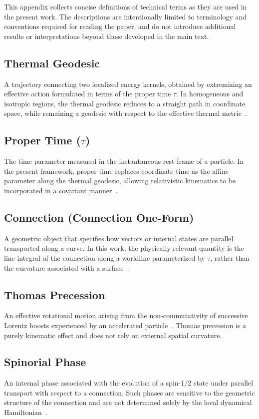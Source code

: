 \documentclass[%
 reprint,
 amsmath,amssymb,
 aps,
 prb,
]{revtex4-2}
\numberwithin{equation}{section}
\begin{document}
This appendix collects concise definitions of technical terms as they are used in the present work. The descriptions are intentionally limited to terminology and conventions required for reading the paper, and do not introduce additional results or interpretations beyond those developed in the main text.

\subsection*{Thermal Geodesic}
A trajectory connecting two localized energy kernels, obtained by extremizing an effective action formulated in terms of the proper time $\tau$. In homogeneous and isotropic regions, the thermal geodesic reduces to a straight path in coordinate space, while remaining a geodesic with respect to the effective thermal metric~\cite{hanamura17765017}.

\subsection*{Proper Time ($\tau$)}
The time parameter measured in the instantaneous rest frame of a particle. In the present framework, proper time replaces coordinate time as the affine parameter along the thermal geodesic, allowing relativistic kinematics to be incorporated in a covariant manner~\cite{schwinger1951,bjorken1964}.

\subsection*{Connection (Connection One-Form)}
A geometric object that specifies how vectors or internal states are parallel transported along a curve. In this work, the physically relevant quantity is the line integral of the connection along a worldline parameterized by $\tau$, rather than the curvature associated with a surface~\cite{nakahara2003}.

\subsection*{Thomas Precession}
An effective rotational motion arising from the non-commutativity of successive Lorentz boosts experienced by an accelerated particle~\cite{thomas1926,Jackson1999}. Thomas precession is a purely kinematic effect and does not rely on external spatial curvature.

\subsection*{Spinorial Phase}
An internal phase associated with the evolution of a spin-1/2 state under parallel transport with respect to a connection. Such phases are sensitive to the geometric structure of the connection and are not determined solely by the local dynamical Hamiltonian~\cite{wigner1939,sakurai2017}.
\end{document}
